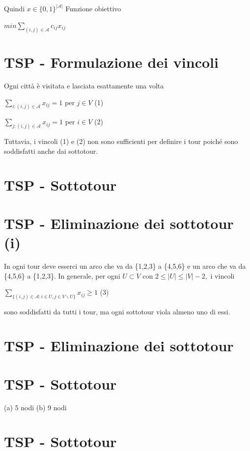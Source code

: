 \documentclass[a4paper, 11pt]{article}
\begin{document}
        Quindi $x\in\{0,1\}^{|\mathcal{A}|}$
        Funzione obiettivo

        $min\sum_{(i,j)\in\mathcal{A}}c_{ij}x_{ij}$

        \section*{TSP - Formulazione dei vincoli}

        Ogni città è visitata e lasciata esattamente una volta

        $\sum_{i:(i,j)\in\mathcal{A}}x_{ij}=1$ per $j\in V$ (1)

        $\sum_{j:(i,j)\in\mathcal{A}}x_{ij}=1$ per $i\in V$ (2)

        Tuttavia, i vincoli (1) e (2) non sono sufficienti per definire i tour poiché sono soddisfatti anche dai sottotour.

        \section*{TSP - Sottotour}

        \section*{TSP - Eliminazione dei sottotour (i)}

        In ogni tour deve esserci un arco che va da \{1,2,3\} a \{4,5,6\}
        e un arco che va da \{4,5,6\} a \{1,2,3\}. In generale, per ogni
        $U\subset V$ con $2\le|U|\le|V|-2,$ i vincoli

        $\sum_{\{(i,j)\in\mathcal{A}:i\in U,j\in V\backslash U\}}x_{ij}\ge1$ (3)

        sono soddisfatti da tutti i tour, ma ogni sottotour viola almeno uno di essi.

        \section*{TSP - Eliminazione dei sottotour}

        \section*{TSP - Sottotour}

        (a) 5 nodi (b) 9 nodi

        \section*{TSP - Sottotour}
\end{document}
